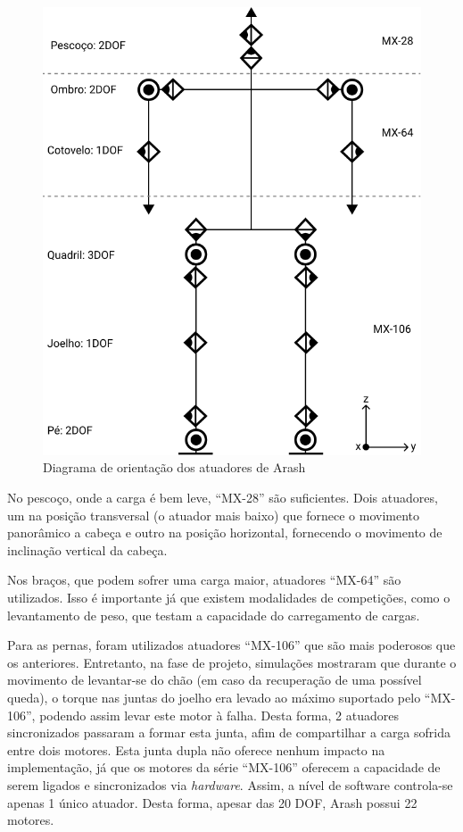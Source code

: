 \begin{figure}[htb]
	\centering
	\includegraphics[scale=1]{imagens/svg/arash-schematics}
	\caption{Diagrama de orientação dos atuadores de Arash}
	\label{fig:architecture:arash:actuators_orientations}
\end{figure}

No pescoço, onde a carga é bem leve, ``MX-28'' são suficientes. Dois atuadores, um na posição transversal (o atuador mais baixo) que fornece o movimento panorâmico a cabeça e outro na posição horizontal, fornecendo o movimento de inclinação vertical da cabeça.

Nos braços, que podem sofrer uma carga maior, atuadores ``MX-64'' são utilizados. Isso é importante já que existem modalidades de competições, como o levantamento de peso, que testam a capacidade do carregamento de cargas.

Para as pernas, foram utilizados atuadores ``MX-106'' que são mais poderosos que os anteriores. Entretanto, na fase de projeto, simulações mostraram que durante o movimento de levantar-se do chão (em caso da recuperação de uma possível queda), o torque nas juntas do joelho era levado ao máximo suportado pelo ``MX-106'', podendo assim levar este motor à falha. Desta forma, 2 atuadores sincronizados passaram a formar esta junta, afim de compartilhar a carga sofrida entre dois motores. Esta junta dupla não oferece nenhum impacto na implementação, já que os motores da série ``MX-106'' oferecem a capacidade de serem ligados e sincronizados via \textit{hardware}. Assim, a nível de software controla-se apenas 1 único atuador. Desta forma, apesar das 20 DOF, Arash possui 22 motores.

